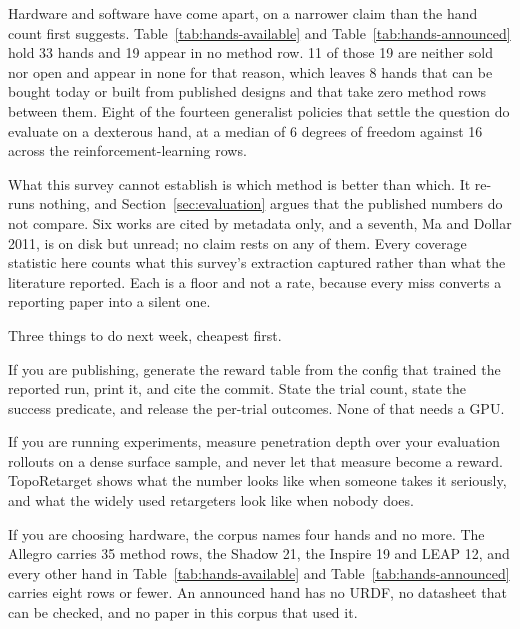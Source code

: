 Hardware and software have come apart, on a narrower claim than the hand count first suggests.
Table~\ref{tab:hands-available} and Table~\ref{tab:hands-announced} hold 33 hands and 19 appear in
no method row. 11 of those 19 are neither sold nor open and appear in none for that reason, which
leaves 8 hands that can be bought today or built from published designs and that take zero method
rows between them. Eight of the fourteen generalist policies that settle the question do evaluate
on a dexterous hand, at a median of 6 degrees of freedom against 16 across the
reinforcement-learning rows.

What this survey cannot establish is which method is better than which. It re-runs nothing, and
Section~\ref{sec:evaluation} argues that the published numbers do not compare. Six works are cited
by metadata only, and a seventh, Ma and Dollar 2011, is on disk but unread; no claim rests on any
of them. Every coverage statistic here counts what this survey's extraction captured rather than
what the literature reported. Each is a floor and not a rate, because every miss converts a
reporting paper into a silent one.

Three things to do next week, cheapest first.

If you are publishing, generate the reward table from the config that trained the reported run,
print it, and cite the commit. State the trial count, state the success predicate, and release the
per-trial outcomes. None of that needs a GPU.

If you are running experiments, measure penetration depth over your evaluation rollouts on a dense
surface sample, and never let that measure become a reward. TopoRetarget \cite{toporetarget_2026}
shows what the number looks like when someone takes it seriously, and what the widely used
retargeters look like when nobody does.

If you are choosing hardware, the corpus names four hands and no more. The Allegro carries 35
method rows, the Shadow 21, the Inspire 19 and LEAP 12, and every other hand in
Table~\ref{tab:hands-available} and Table~\ref{tab:hands-announced} carries eight rows or fewer.
An announced hand has no URDF, no datasheet that can be checked, and no paper in this corpus that
used it.